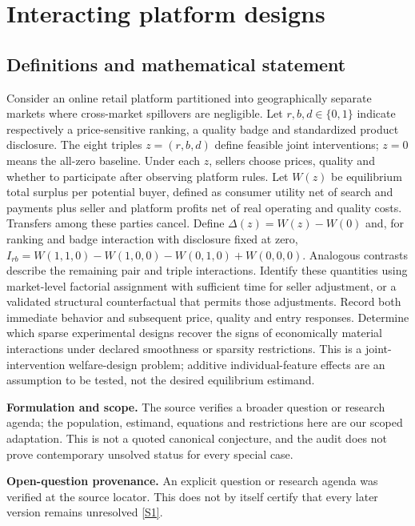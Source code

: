\documentclass[11pt]{article}
\newcommand{\sref}[2]{\hyperlink{source:#1:#2}{[S#2]}}
\begin{document}
\section*{Interacting platform designs}\label{30007683}
\subsection{Definitions and mathematical statement}
Consider an online retail platform partitioned into geographically separate markets where cross-market spillovers are negligible. Let \(r,b,d\in\{0,1\}\) indicate respectively a price-sensitive ranking, a quality badge and standardized product disclosure. The eight triples \(z=(r,b,d)\) define feasible joint interventions; \(z=0\) means the all-zero baseline. Under each \(z\), sellers choose prices, quality and whether to participate after observing platform rules. Let \(W(z)\) be equilibrium total surplus per potential buyer, defined as consumer utility net of search and payments plus seller and platform profits net of real operating and quality costs. Transfers among these parties cancel. Define \(\Delta(z)=W(z)-W(0)\) and, for ranking and badge interaction with disclosure fixed at zero, \(I_{rb}=W(1,1,0)-W(1,0,0)-W(0,1,0)+W(0,0,0)\). Analogous contrasts describe the remaining pair and triple interactions. Identify these quantities using market-level factorial assignment with sufficient time for seller adjustment, or a validated structural counterfactual that permits those adjustments. Record both immediate behavior and subsequent price, quality and entry responses. Determine which sparse experimental designs recover the signs of economically material interactions under declared smoothness or sparsity restrictions. This is a joint-intervention welfare-design problem; additive individual-feature effects are an assumption to be tested, not the desired equilibrium estimand.

\par\textbf{Formulation and scope.} The source verifies a broader question or research agenda; the population, estimand, equations and restrictions here are our scoped adaptation. This is not a quoted canonical conjecture, and the audit does not prove contemporary unsolved status for every special case.

\par\textbf{Open-question provenance.} An explicit question or research agenda was verified at the source locator. This does not by itself certify that every later version remains unresolved \sref{30007683}{1}.
\end{document}
